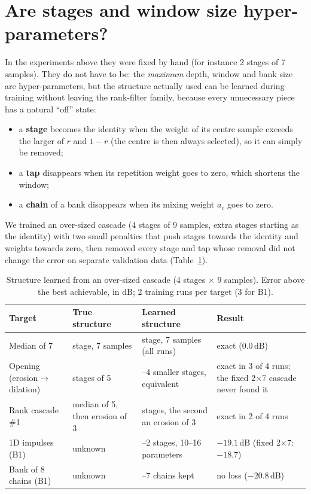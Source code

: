 \documentclass[11pt,a4paper]{article}
\begin{document}
\section{Are stages and window size hyper-parameters?}\label{sec:struct}
In the experiments above they were fixed by hand (for instance 2 stages of 7 samples). They do not have to be: the
\emph{maximum} depth, window and bank size are hyper-parameters, but the structure actually used can be learned during
training without leaving the rank-filter family, because every unnecessary piece has a natural ``off'' state:
\begin{itemize}\itemsep0pt
\item a \textbf{stage} becomes the identity when the weight of its centre sample exceeds the larger of $r$ and $1-r$
  (the centre is then always selected), so it can simply be removed;
\item a \textbf{tap} disappears when its repetition weight goes to zero, which shortens the window;
\item a \textbf{chain} of a bank disappears when its mixing weight $a_c$ goes to zero.
\end{itemize}
We trained an over-sized cascade (4 stages of 9 samples, extra stages starting as the identity) with two small
penalties that push stages towards the identity and weights towards zero, then removed every stage and tap whose
removal did not change the error on separate validation data (Table~\ref{tab:struct}).

\begin{table}[h]\centering\small
\caption{Structure learned from an over-sized cascade (4 stages $\times$ 9 samples). Error above the best achievable,
in dB; 2 training runs per target (3 for B1).}\label{tab:struct}
\begin{tabularx}{\linewidth}{@{}l>{\raggedright\arraybackslash}X>{\raggedright\arraybackslash}X>{\raggedright\arraybackslash}X@{}}\toprule
Target & True structure & Learned structure & Result\\\midrule
Median of 7 & 1 stage, 7 samples & 1 stage, 7 samples (all runs) & exact (0.0\,dB)\\
Opening (erosion$\to$dilation) & 2 stages of 5 & 3--4 smaller stages, equivalent & exact in 3 of 4 runs; the fixed 2$\times$7 cascade never found it\\
Rank cascade \#1 & median of 5, then erosion of 3 & 2 stages, the second an erosion of 3 & exact in 2 of 4 runs\\
1D impulses (B1) & unknown & 1--2 stages, 10--16 parameters & $-19.1$\,dB (fixed 2$\times$7: $-18.7$)\\
Bank of 8 chains (B1) & unknown & 6--7 chains kept & no loss ($-20.8$\,dB)\\
\bottomrule\end{tabularx}
\end{table}
\end{document}
